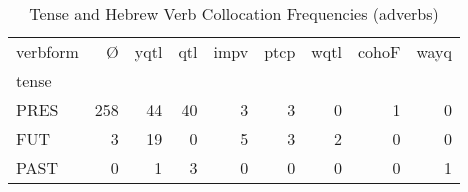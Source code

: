 \begin{table}[htbp!]
\centering
\caption{Tense and Hebrew Verb Collocation Frequencies (adverbs)}
\label{table:advb_tense_ct}
\begin{tabular}{lrrrrrrrr}
\toprule
verbform &    Ø &  yqtl &  qtl &  impv &  ptcp &  wqtl &  cohoF &  wayq \\
tense &      &       &      &       &       &       &        &       \\
\midrule
PRES  &  258 &    44 &   40 &     3 &     3 &     0 &      1 &     0 \\
FUT   &    3 &    19 &    0 &     5 &     3 &     2 &      0 &     0 \\
PAST  &    0 &     1 &    3 &     0 &     0 &     0 &      0 &     1 \\
\bottomrule
\end{tabular}
\end{table}
